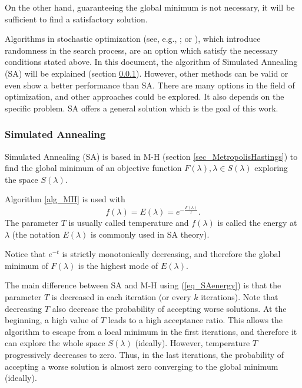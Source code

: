 On the other hand, guaranteeing the global minimum is not necessary, it will be sufficient to find a satisfactory solution.

Algorithms in stochastic optimization (see, e.g., \textcite{spall2003}; or \textcite{zilinskas2016}), which introduce randomness in the search process, are an option which satisfy the necessary conditions stated above. 
In this document, the algorithm of Simulated Annealing (SA) will be explained (section \ref{sec_SimulatedAnnealing}). 
However, other methods can be valid or even show a better performance than SA. 
There are many options in the field of optimization, and other approaches could be explored.
It also depends on the specific problem. 
SA offers a general solution which is the goal of this work.


\subsubsection{Simulated Annealing} \label{sec_SimulatedAnnealing}

Simulated Annealing (SA) is based in M-H (section \ref{sec_MetropolisHastings}) to find the global minimum of an objective function $F(\lambda), \lambda \in S(\lambda)$ exploring the space $S(\lambda)$.

Algorithm \ref{alg_MH} is used with
\begin{equation} \label{eq_SAenergy}
  f(\lambda) = E(\lambda) = e^{-\frac{F(\lambda)}{T}}.
\end{equation}
The parameter $T$ is usually called temperature and $f(\lambda)$ is called the energy at $\lambda$ (the notation $E(\lambda)$ is commonly used in SA theory).

\begin{remark}
Notice that $e^{-t}$ is strictly monotonically decreasing, and therefore the global minimum of $F(\lambda)$ is the highest mode of $E(\lambda)$.
\end{remark}

The main difference between SA and M-H using (\ref{eq_SAenergy}) is that the parameter $T$ is decreased in each iteration (or every $k$ iterations).
Note that decreasing $T$ also decrease the probability of accepting worse solutions. 
At the beginning, a high value of $T$ leads to a high acceptance ratio. 
This allows the algorithm to escape from a local minimum in the first iterations, and therefore it can explore the whole space $S(\lambda)$ (ideally).
However, temperature $T$ progressively decreases to zero. Thus, in the last iterations, the probability of accepting a worse solution is almost zero converging to the global minimum (ideally).

